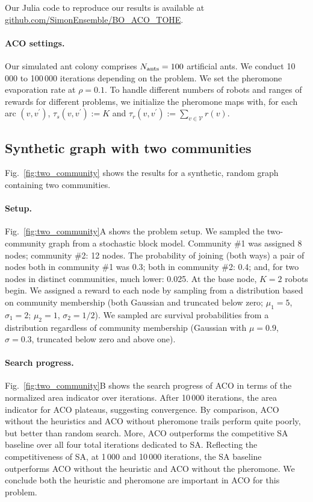 \documentclass[fleqn,10pt,lineno]{wlpeerj}
\begin{document}
Our Julia code to reproduce our results is available at \url{github.com/SimonEnsemble/BO_ACO_TOHE}.

\paragraph{ACO settings.} Our simulated ant colony comprises $N_{\rm ants}=100$ artificial ants. We conduct 10\,000 to 100\,000 iterations depending on the problem.
We set the pheromone evaporation rate at $\rho=0.1$. To handle different numbers of robots and ranges of rewards for different problems, we initialize the pheromone maps with, for each arc $(v, v^\prime)$, $\tau_s(v, v^\prime) := K$ and $\tau_r(v, v^\prime) := \sum_{v \in \mathcal{V}} r(v)$.


  
\subsection{Synthetic graph with two communities}
Fig.~\ref{fig:two_community} shows the results for a synthetic, random graph containing two communities.

\paragraph{Setup.}
Fig.~\ref{fig:two_community}A shows the problem setup.
We sampled the two-community graph from a stochastic block model. Community \#1 was assigned 8 nodes; community \#2: 12 nodes.
The probability of joining (both ways) a pair of nodes both in community \#1 was 0.3; both in community \#2: 0.4; and, for two nodes in distinct communities, much lower: 0.025.
At the base node, $K=2$ robots begin.
We assigned a reward to each node by sampling from a distribution based on community membership (both Gaussian and truncated below zero; $\mu_1=5$, $\sigma_1=2$; $\mu_2=1$, $\sigma_2=1/2$).
We sampled arc survival probabilities from a distribution regardless of community membership (Gaussian with $\mu=0.9$, $\sigma=0.3$, truncated below zero and above one).


\paragraph{Search progress.}
Fig.~\ref{fig:two_community}B shows the search progress of ACO in terms of the normalized area indicator over iterations. After 10\,000 iterations, the area indicator for ACO plateaus, suggesting convergence. By comparison, ACO without the heuristics and ACO without pheromone trails perform quite poorly, but better than random search. 
More, ACO outperforms the competitive SA baseline over all four total iterations dedicated to SA.
Reflecting the competitiveness of SA, at 1\,000 and 10\,000 iterations, the SA baseline outperforms ACO without the heuristic and ACO without the pheromone.  
We conclude both the heuristic and pheromone are important in ACO for this problem.
\end{document}
